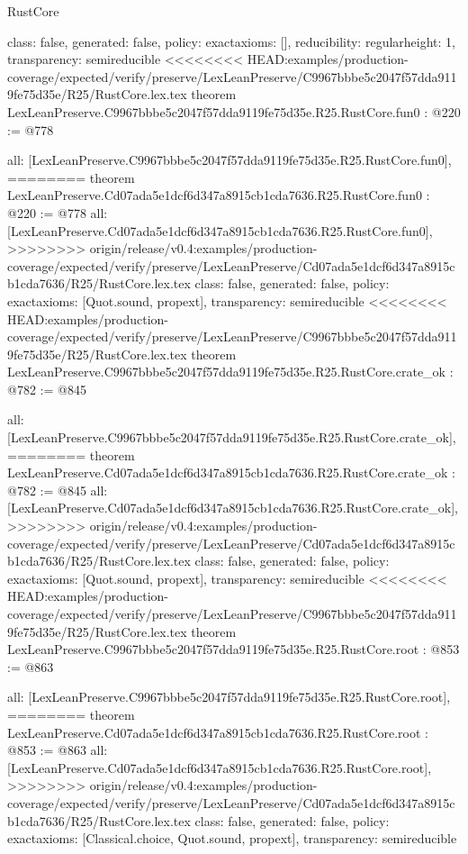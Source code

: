\begin{lexlean}{RustCore}
\begin{coremodule}
{\begin{coremodule}
{{{  class: false,
  generated: false,
  policy: exact{axioms: []},
  reducibility: regular{height: 1},
  transparency: semireducible
}
<<<<<<<< HEAD:examples/production-coverage/expected/verify/preserve/LexLeanPreserve/C9967bbbe5c2047f57dda9119fe75d35e/R25/RustCore.lex.tex
theorem LexLeanPreserve.C9967bbbe5c2047f57dda9119fe75d35e.R25.RustCore.fun0 : @220 := @778 {
  all: [LexLeanPreserve.C9967bbbe5c2047f57dda9119fe75d35e.R25.RustCore.fun0],
========
theorem LexLeanPreserve.Cd07ada5e1dcf6d347a8915cb1cda7636.R25.RustCore.fun0 : @220 := @778 {
  all: [LexLeanPreserve.Cd07ada5e1dcf6d347a8915cb1cda7636.R25.RustCore.fun0],
>>>>>>>> origin/release/v0.4:examples/production-coverage/expected/verify/preserve/LexLeanPreserve/Cd07ada5e1dcf6d347a8915cb1cda7636/R25/RustCore.lex.tex
  class: false,
  generated: false,
  policy: exact{axioms: [Quot.sound, propext]},
  transparency: semireducible
}
<<<<<<<< HEAD:examples/production-coverage/expected/verify/preserve/LexLeanPreserve/C9967bbbe5c2047f57dda9119fe75d35e/R25/RustCore.lex.tex
theorem LexLeanPreserve.C9967bbbe5c2047f57dda9119fe75d35e.R25.RustCore.crate_ok : @782 := @845 {
  all: [LexLeanPreserve.C9967bbbe5c2047f57dda9119fe75d35e.R25.RustCore.crate_ok],
========
theorem LexLeanPreserve.Cd07ada5e1dcf6d347a8915cb1cda7636.R25.RustCore.crate_ok : @782 := @845 {
  all: [LexLeanPreserve.Cd07ada5e1dcf6d347a8915cb1cda7636.R25.RustCore.crate_ok],
>>>>>>>> origin/release/v0.4:examples/production-coverage/expected/verify/preserve/LexLeanPreserve/Cd07ada5e1dcf6d347a8915cb1cda7636/R25/RustCore.lex.tex
  class: false,
  generated: false,
  policy: exact{axioms: [Quot.sound, propext]},
  transparency: semireducible
}
<<<<<<<< HEAD:examples/production-coverage/expected/verify/preserve/LexLeanPreserve/C9967bbbe5c2047f57dda9119fe75d35e/R25/RustCore.lex.tex
theorem LexLeanPreserve.C9967bbbe5c2047f57dda9119fe75d35e.R25.RustCore.root : @853 := @863 {
  all: [LexLeanPreserve.C9967bbbe5c2047f57dda9119fe75d35e.R25.RustCore.root],
========
theorem LexLeanPreserve.Cd07ada5e1dcf6d347a8915cb1cda7636.R25.RustCore.root : @853 := @863 {
  all: [LexLeanPreserve.Cd07ada5e1dcf6d347a8915cb1cda7636.R25.RustCore.root],
>>>>>>>> origin/release/v0.4:examples/production-coverage/expected/verify/preserve/LexLeanPreserve/Cd07ada5e1dcf6d347a8915cb1cda7636/R25/RustCore.lex.tex
  class: false,
  generated: false,
  policy: exact{axioms: [Classical.choice, Quot.sound, propext]},
  transparency: semireducible
}

}}}}}
\end{coremodule}}
\end{coremodule}
\end{lexlean}

